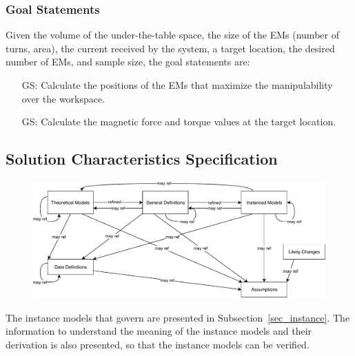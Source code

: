 \documentclass[12pt]{article}
\newcounter{goalnum} %
\begin{document}
\subsubsection{Goal Statements}
\noindent Given the volume of the under-the-table space, the size of the EMs (number of turns, area), the current received by the system, a target location, the desired number of EMs, and sample size, the goal statements are:
\begin{itemize}
\item[GS\refstepcounter{goalnum}\thegoalnum \label{G_1}:] Calculate the positions of the EMs that maximize the manipulability over the workspace.
\item[GS\refstepcounter{goalnum}\thegoalnum \label{G_meaningfulLabel}:] Calculate the magnetic force and torque values at the target location.
\end{itemize}

\subsection{Solution Characteristics Specification}
\begin{figure}[H]
  \includegraphics[scale=0.9]{RelationsBetweenTM_GD_IM_DD_A.pdf}
\end{figure}
The instance models that govern \progname{} are presented in
Subsection~\ref{sec_instance}.  The information to understand the meaning of the
instance models and their derivation is also presented, so that the instance
models can be verified.
\end{document}
